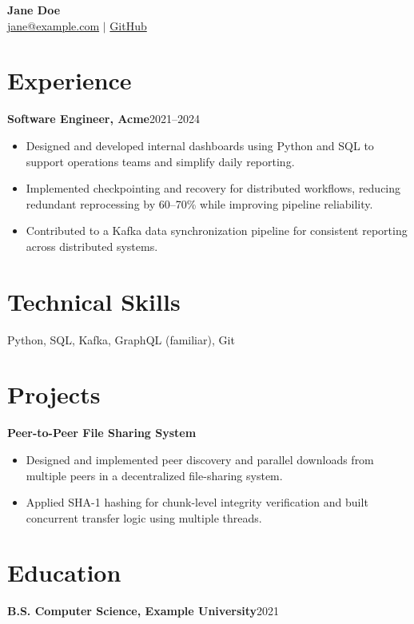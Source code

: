 \documentclass[10pt,letterpaper]{article}
\newcommand{\resumeItem}[1]{\item #1}
\begin{document}
\begin{center}
{\LARGE\bfseries Jane Doe}\\[3pt]
\href{mailto:jane@example.com}{jane@example.com} $|$
\href{https://github.com/example}{GitHub}
\end{center}
\section*{Experience}
\textbf{Software Engineer, Acme}\hfill 2021--2024
\begin{itemize}[leftmargin=*]
\resumeItem{Designed and developed internal dashboards using Python and SQL to support operations teams and simplify daily reporting.}
\resumeItem{Implemented checkpointing and recovery for distributed workflows, reducing redundant reprocessing by 60--70\% while improving pipeline reliability.}
\resumeItem{Contributed to a Kafka data synchronization pipeline for consistent reporting across distributed systems.}
\end{itemize}
\section*{Technical Skills}
Python, SQL, Kafka, GraphQL (familiar), Git
\section*{Projects}
\textbf{Peer-to-Peer File Sharing System}
\begin{itemize}[leftmargin=*]
\resumeItem{Designed and implemented peer discovery and parallel downloads from multiple peers in a decentralized file-sharing system.}
\resumeItem{Applied SHA-1 hashing for chunk-level integrity verification and built concurrent transfer logic using multiple threads.}
\end{itemize}
\section*{Education}
\textbf{B.S. Computer Science, Example University}\hfill 2021
\end{document}
